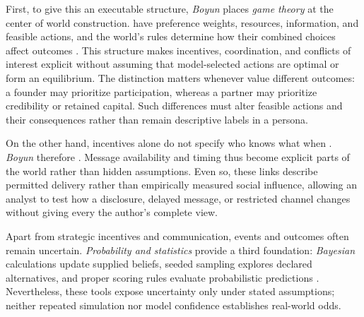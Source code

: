 First, to give this  an executable structure, \textit{Boyun}
places \textit{game theory} at the center of world construction.  have preference weights, resources, information, and feasible
actions, and the world's rules determine how their combined choices affect
outcomes \cite{polak2,nash1950}. This structure makes incentives, coordination,
and conflicts of interest explicit without assuming that model-selected actions
are optimal or form an equilibrium. The distinction matters whenever
 value different outcomes: a founder  may prioritize
participation, whereas a partner  may prioritize credibility or
retained capital. Such differences must alter feasible actions and their
consequences rather than remain descriptive labels in a persona.

On the other hand, incentives alone do not specify who knows what when . \textit{Boyun} therefore . Message availability and timing thus
become explicit parts of the world rather than hidden assumptions. Even so,
these  links describe permitted delivery rather than
empirically measured social influence, allowing an analyst to test how a
disclosure, delayed message, or restricted channel changes  without giving every  the author's complete
view.

Apart from strategic incentives and  communication, events
and outcomes often remain uncertain. \textit{Probability and statistics}
provide a third foundation: \textit{Bayesian} calculations update supplied
beliefs, seeded sampling explores declared alternatives, and proper scoring
rules evaluate probabilistic predictions \cite{pishronik2014,brier1950,gneiting2007}.
Nevertheless, these tools expose uncertainty only under stated assumptions;
neither repeated simulation nor model confidence establishes real-world odds.

